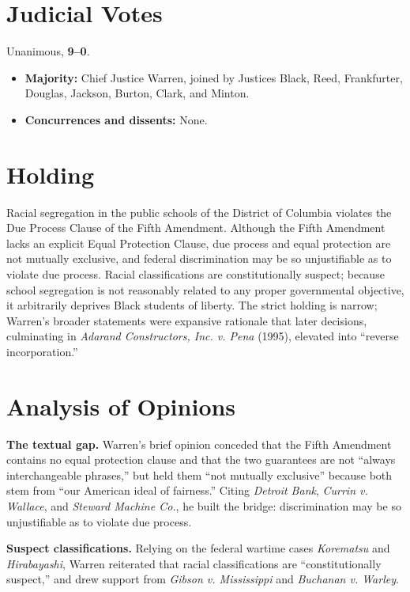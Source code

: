 \documentclass[12pt]{article}
\begin{document}
\section{Judicial Votes}

Unanimous, \textbf{9--0}.
\begin{itemize}
\item \textbf{Majority:} Chief Justice Warren, joined by Justices Black, Reed, Frankfurter, Douglas, Jackson, Burton, Clark, and Minton.
\item \textbf{Concurrences and dissents:} None.
\end{itemize}

\section{Holding}

Racial segregation in the public schools of the District of Columbia violates the Due Process Clause of the Fifth Amendment. Although the Fifth Amendment lacks an explicit Equal Protection Clause, due process and equal protection are not mutually exclusive, and federal discrimination may be so unjustifiable as to violate due process. Racial classifications are constitutionally suspect; because school segregation is not reasonably related to any proper governmental objective, it arbitrarily deprives Black students of liberty. The strict holding is narrow; Warren's broader statements were expansive rationale that later decisions, culminating in \textit{Adarand Constructors, Inc. v. Pena} (1995), elevated into ``reverse incorporation.''

\section{Analysis of Opinions}

\textbf{The textual gap.} Warren's brief opinion conceded that the Fifth Amendment contains no equal protection clause and that the two guarantees are not ``always interchangeable phrases,'' but held them ``not mutually exclusive'' because both stem from ``our American ideal of fairness.'' Citing \textit{Detroit Bank}, \textit{Currin v. Wallace}, and \textit{Steward Machine Co.}, he built the bridge: discrimination may be so unjustifiable as to violate due process.

\textbf{Suspect classifications.} Relying on the federal wartime cases \textit{Korematsu} and \textit{Hi\-ra\-ba\-ya\-shi}, Warren reiterated that racial classifications are ``constitutionally suspect,'' and drew support from \textit{Gibson v. Mississippi} and \textit{Buchanan v. Warley}.
\end{document}
